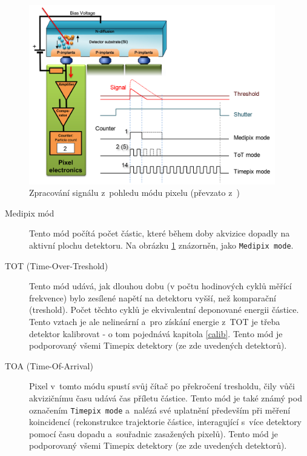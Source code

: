 \begin{figure}[th!]
	\begin{center}
		\includegraphics[width=10.75cm]{figures/det_pix.png}
		\caption{Zpracování signálu z~pohledu módu pixelu (převzato z~\cite{PlatkevicDisertace})}
		\label{fig:det:signal_proc}
	\end{center}
\end{figure}

\begin{description}
	\item[Medipix mód] Tento mód počítá počet částic, které během doby akvizice dopadly na aktivní plochu detektoru. Na obrázku \ref{fig:det:signal_proc} znázorněn, jako \texttt{Medipix mode}.
	\item[TOT (Time-Over-Treshold)] Tento mód udává, jak dlouhou dobu (v počtu hodinových cyklů měřící frekvence) bylo zesílené napětí na detektoru vyšší, než komparační (treshold). Počet těchto cyklů je ekvivalentní deponované energii částice. Tento vztach je ale nelineární a~pro získání energie z~TOT je třeba detektor kalibrovat - o tom pojednává kapitola \ref{calib}. Tento mód je podporovaný všemi Timepix detektory (ze zde uvedených detektorů).
	\item[TOA (Time-Of-Arrival)] Pixel v~tomto módu spustí svůj čítač po překročení tresholdu, čily vůči akvizičnímu času udává čas příletu částice. Tento mód je také známý pod označením \texttt{Timepix mode} a~nalézá své uplatnění především při měření koincidencí (rekonstrukce trajektorie částice, interagující s~více detektory pomocí času dopadu a~souřadnic zasažených pixelů). Tento mód je podporovaný všemi Timepix detektory (ze zde uvedených detektorů).

\end{description}

